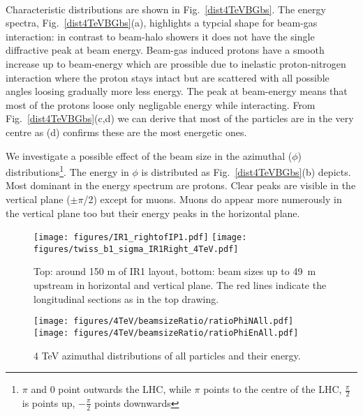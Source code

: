 {\\}
Characteristic distributions are shown in Fig.~\ref{dist4TeVBGbs}. The energy spectra, Fig.~\ref{dist4TeVBGbs}(a), highlights a typcial shape for beam-gas interaction: in contrast to beam-halo showers it does not have the single diffractive peak at beam energy. Beam-gas induced protons have a smooth increase up to beam-energy which are prossible due to inelastic proton-nitrogen interaction where the proton stays intact but are scattered with all possible angles loosing gradually more less energy. The peak at beam-energy means that most of the protons loose only negligable energy while interacting. From Fig.~\ref{dist4TeVBGbs}(c,d) we can derive that most of the particles are in the very centre as (d) confirms these are the most energetic ones. 

We investigate a possible effect of the beam size in the azimuthal ($\phi$) distributions\footnote{$\pi$ and $0$ point outwards the LHC, while $\pi$ points to the centre of the LHC, $\frac{\pi}{2}$ is points up, $-\frac{\pi}{2}$ points downwards}. The energy in $\phi$ is distributed as Fig.~\ref{dist4TeVBGbs}(b) depicts. Most dominant in the energy spectrum are protons. Clear peaks are visible in the vertical plane ($\pm\pi$/2) except for muons. Muons do appear more numerously in the vertical plane too but their energy peaks in the horizontal plane.

\begin{figure}[!htb]
\begin{center}
  \texttt{[image: figures/IR1\_rightofIP1.pdf]}
  \texttt{[image: figures/twiss\_b1\_sigma\_IR1Right\_4TeV.pdf]}
\end{center}
\vspace{-0.6cm}
 \caption{Top: around 150 m of IR1 layout, bottom: beam sizes up to 49~m upstream in horizontal and vertical plane. The red lines indicate the longitudinal sections as in the top drawing. 
  \label{twissfileBS}}
\end{figure}

\begin{figure}[!htb]
\begin{center}
  \texttt{[image: figures/4TeV/beamsizeRatio/ratioPhiNAll.pdf]}
  \texttt{[image: figures/4TeV/beamsizeRatio/ratioPhiEnAll.pdf]}
\end{center}
\vspace{-0.6cm}
 \caption{4 TeV azimuthal distributions of all particles and their energy.
  \label{bsRatioPhiAll}}
\end{figure}

